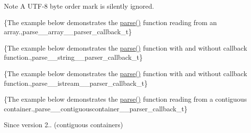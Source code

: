 \begin{DoxyNote}{Note}
A U\+T\+F-\/8 byte order mark is silently ignored.
\end{DoxyNote}
\{The example below demonstrates the {\ttfamily \mbox{\hyperlink{classnlohmann_1_1basic__json_a265a473e939184aa42655c9ccdf34e58}{parse()}}} function reading from an array.,parse\+\_\+\+\_\+array\+\_\+\+\_\+parser\+\_\+callback\+\_\+t\}

\{The example below demonstrates the {\ttfamily \mbox{\hyperlink{classnlohmann_1_1basic__json_a265a473e939184aa42655c9ccdf34e58}{parse()}}} function with and without callback function.,parse\+\_\+\+\_\+string\+\_\+\+\_\+parser\+\_\+callback\+\_\+t\}

\{The example below demonstrates the {\ttfamily \mbox{\hyperlink{classnlohmann_1_1basic__json_a265a473e939184aa42655c9ccdf34e58}{parse()}}} function with and without callback function.,parse\+\_\+\+\_\+istream\+\_\+\+\_\+parser\+\_\+callback\+\_\+t\}

\{The example below demonstrates the {\ttfamily \mbox{\hyperlink{classnlohmann_1_1basic__json_a265a473e939184aa42655c9ccdf34e58}{parse()}}} function reading from a contiguous container.,parse\+\_\+\+\_\+contiguouscontainer\+\_\+\+\_\+parser\+\_\+callback\+\_\+t\}

\begin{DoxySince}{Since}
version 2.. (contiguous containers) 
\end{DoxySince}
\mbox{\label{classnlohmann_1_1basic__json_ab330c13ba254ea41fbc1c52c5c610f45}} 
